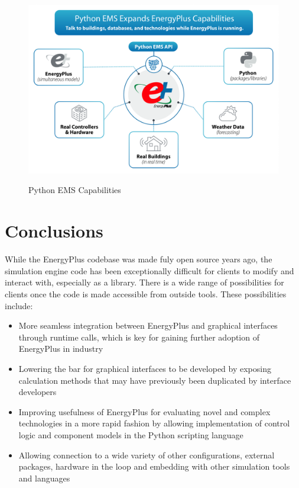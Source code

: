 \documentclass[5p, authoryear]{elsarticle}
\begin{document}
\begin{figure}
\begin{center}
\label{figure:plugins:python_ems}
\includegraphics[width=\columnwidth]{images/python_ems.png}
\caption{Python EMS Capabilities}
\end{center}
\end{figure}

 \section{Conclusions}
While the EnergyPlus codebase was made fuly open source years ago, the simulation engine code has been exceptionally difficult for clients to modify and interact with, especially as a library.  There is a wide range of possibilities for clients once the code is made accessible from outside tools.  These possibilities include:

\begin{itemize}
 \item More seamless integration between EnergyPlus and graphical interfaces through runtime calls, which is key for gaining further adoption of EnergyPlus in industry
 \item Lowering the bar for graphical interfaces to be developed by exposing calculation methods that may have previously been duplicated by interface developers
 \item Improving usefulness of EnergyPlus for evaluating novel and complex technologies in a more rapid fashion by allowing implementation of control logic and component models in the Python scripting language
 \item Allowing connection to a wide variety of other configurations, external packages, hardware in the loop and embedding with other simulation tools and languages
\end{itemize}
\end{document}
